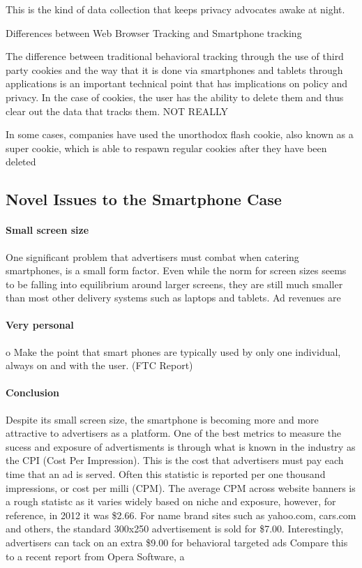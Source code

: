 This is the kind of data collection that keeps privacy advocates awake at night. 

Differences between Web Browser Tracking and Smartphone tracking

The difference between traditional behavioral tracking through the use of third party cookies and the way that it is done via smartphones and tablets through applications is an important technical point that has implications on policy and privacy. In the case of cookies, the user has the ability to delete them and thus clear out the data that tracks them. NOT REALLY

In some cases, companies have used the unorthodox flash cookie, also known as a super cookie, which is able to respawn regular cookies after they have been deleted


	\subsection{Novel Issues to the Smartphone Case}

		\paragraph{Small screen size} %
One significant problem that advertisers must combat when catering smartphones, is a small form factor. 
Even while the norm for screen sizes seems to be falling into equilibrium around larger screens, they are still much smaller than most other delivery systems such as laptops and tablets. 
Ad revenues are 

		\paragraph{Very personal}     %

o Make the point that smart phones are typically used by only one individual, always on and with the user. (FTC Report)

		\paragraph{Conclusion}
Despite its small screen size, the smartphone is becoming more and more attractive to advertisers as a platform.  
One of the best metrics to measure the sucess and exposure of advertisments is through what is known in the industry as the CPI (Cost Per Impression). 
This is the cost that advertisers must pay each time that an ad is served. Often this statistic is reported per one thousand impressions, or cost per milli (CPM). The average CPM across website banners is a rough statistc as it varies widely based on niche and exposure, however, for reference, in 2012 it was \$2.66\cite{adage}. For name brand sites such as yahoo.com, cars.com and others, the standard 300x250 advertisement is sold for \$7.00. Interestingly, advertisers can tack on an extra \$9.00 for behavioral targeted ads\cite{interactive_media} Compare this to a recent report from Opera Software, a 




